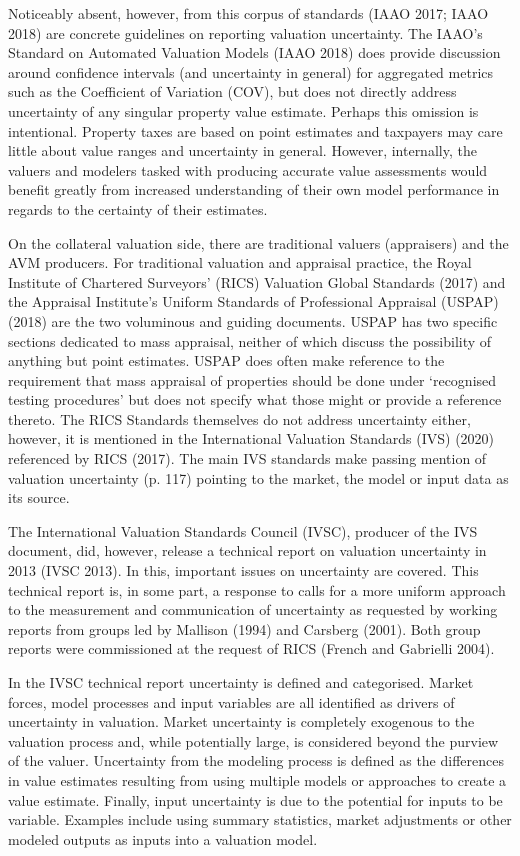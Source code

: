 \documentclass[colTwo]{format}
\theoremstyle{definition}
\begin{document}
Noticeably absent, however, from this corpus of standards (IAAO 2017; IAAO 2018) are concrete guidelines on reporting valuation uncertainty.  The IAAO’s Standard on Automated Valuation Models (IAAO 2018) does provide discussion around confidence intervals (and uncertainty in general) for aggregated metrics such as the Coefficient of Variation (COV), but does not directly address uncertainty of any singular property value estimate.  Perhaps this omission is intentional.  Property taxes are based on point estimates and taxpayers may care little about value ranges and uncertainty in general.  However, internally, the valuers and modelers tasked with producing accurate value assessments would benefit greatly from increased understanding of their own model performance in regards to the certainty of their estimates.		

On the collateral valuation side, there are traditional valuers (appraisers) and the AVM producers. For traditional valuation and appraisal practice, the Royal Institute of Chartered Surveyors’ (RICS) Valuation Global Standards (2017) and the Appraisal Institute’s Uniform Standards of Professional Appraisal (USPAP) (2018) are the two voluminous and guiding documents. USPAP has two specific sections dedicated to mass appraisal, neither of which discuss the possibility of anything but point estimates. USPAP does often make reference to the requirement that mass appraisal of properties should be done under ‘recognised testing procedures’ but does not specify what those might or provide a reference thereto. The RICS Standards themselves do not address uncertainty either, however, it is mentioned in the International Valuation Standards (IVS) (2020) referenced by RICS (2017).  The main IVS standards make passing mention of valuation uncertainty (p. 117) pointing to the market, the model or input data as its source.  

The International Valuation Standards Council (IVSC), producer of the IVS document, did, however, release a technical report on valuation uncertainty in 2013 (IVSC 2013). In this, important issues on uncertainty are covered. This technical report is, in some part, a response to calls for a more uniform approach to the measurement and communication of uncertainty as requested by working reports from groups led by Mallison (1994) and Carsberg (2001).  Both group reports were commissioned at the request of RICS (French and Gabrielli 2004). 

In the IVSC technical report uncertainty is defined and categorised.  Market forces, model processes and input variables are all identified as drivers of uncertainty in valuation. Market uncertainty is completely exogenous to the valuation process and, while potentially large, is considered beyond the purview of the valuer.   Uncertainty from the modeling process is defined as the differences in value estimates resulting from using multiple models or approaches to create a value estimate.  Finally, input uncertainty is due to the potential for inputs to be variable.  Examples include using summary statistics, market adjustments or other modeled outputs as inputs into a valuation model.  
\end{document}
